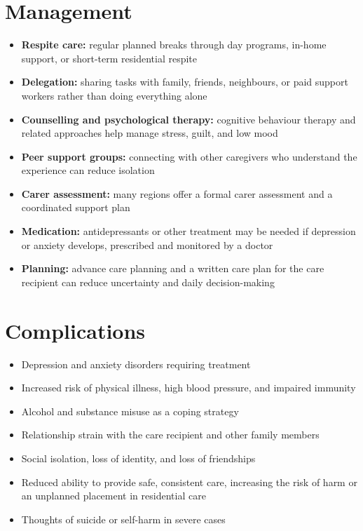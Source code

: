 \section*{Management}
\begin{itemize}
    \item \textbf{Respite care:} regular planned breaks through day programs, in-home support, or short-term residential respite
    \item \textbf{Delegation:} sharing tasks with family, friends, neighbours, or paid support workers rather than doing everything alone
    \item \textbf{Counselling and psychological therapy:} cognitive behaviour therapy and related approaches help manage stress, guilt, and low mood
    \item \textbf{Peer support groups:} connecting with other caregivers who understand the experience can reduce isolation
    \item \textbf{Carer assessment:} many regions offer a formal carer assessment and a coordinated support plan
    \item \textbf{Medication:} antidepressants or other treatment may be needed if depression or anxiety develops, prescribed and monitored by a doctor
    \item \textbf{Planning:} advance care planning and a written care plan for the care recipient can reduce uncertainty and daily decision-making
\end{itemize}

\section*{Complications}
\begin{itemize}
    \item Depression and anxiety disorders requiring treatment
    \item Increased risk of physical illness, high blood pressure, and impaired immunity
    \item Alcohol and substance misuse as a coping strategy
    \item Relationship strain with the care recipient and other family members
    \item Social isolation, loss of identity, and loss of friendships
    \item Reduced ability to provide safe, consistent care, increasing the risk of harm or an unplanned placement in residential care
    \item Thoughts of suicide or self-harm in severe cases
\end{itemize}

